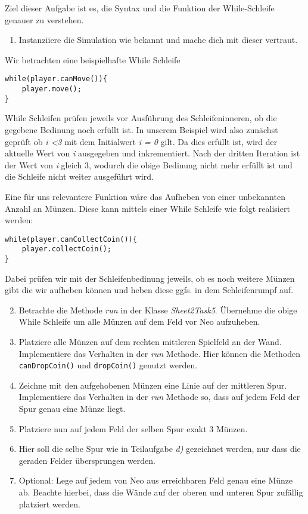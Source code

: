 
Ziel dieser Aufgabe ist es, die Syntax und die Funktion der While-Schleife genauer zu verstehen.
\begin{enumerate}[label=\alph*)]
    \item Instanziiere die Simulation wie bekannt und mache dich mit dieser vertraut.
\end{enumerate}

\begin{Infobox}
    Wir betrachten eine beispielhafte While Schleife
    \begin{lstlisting}[breaklines=true, numbers=none]
while(player.canMove()){
    player.move();
}
    \end{lstlisting}
    While Schleifen prüfen jeweils vor Ausführung des Schleifeninneren, ob die gegebene Bedinung noch erfüllt ist. In unserem Beispiel 
    wird also zunächst geprüft ob \textit{i \textless 3} mit dem Initialwert \textit{i = 0} gilt. Da dies erfüllt ist, wird der aktuelle Wert von \textit{i}
    ausgegeben und inkrementiert. Nach der dritten Iteration ist der Wert von \textit{i} gleich 3, wodurch die obige Bedinung nicht mehr erfüllt ist
    und die Schleife nicht weiter ausgeführt wird.\par 
    Eine für uns relevantere Funktion wäre das Aufheben von einer unbekannten Anzahl an Münzen. Diese kann mittels einer While Schleife wie folgt 
    realisiert werden:
    \begin{lstlisting}[breaklines=true, numbers=none]
while(player.canCollectCoin()){
    player.collectCoin();
}
    \end{lstlisting}
    Dabei prüfen wir mit der Schleifenbedinung
    jeweils, ob es noch weitere Münzen gibt die wir aufheben können und heben diese ggfs. in dem Schleifenrumpf auf.
\end{Infobox}

\begin{enumerate}[label=\alph*)] \setcounter{enumi}{1}
    \item Betrachte die Methode \textit{run} in der Klasse \textit{Sheet2Task5}. Übernehme die obige While Schleife um 
    alle Münzen auf dem Feld vor Neo aufzuheben.
    \item Platziere alle Münzen auf dem rechten mittleren Spielfeld an der Wand. Implementiere das Verhalten in der \textit{run} Methode.
    Hier können die Methoden \lstinline{canDropCoin()} und \lstinline{dropCoin()} genutzt werden.
    \item Zeichne mit den aufgehobenen Münzen eine Linie auf der mittleren Spur. Implementiere das Verhalten in der \textit{run} Methode so, dass 
    auf jedem Feld der Spur genau eine Münze liegt.
    \item Platziere nun auf jedem Feld der selben Spur exakt 3 Münzen.
    \item Hier soll die selbe Spur wie in Teilaufgabe \textit{d)} gezeichnet werden, nur dass die geraden Felder übersprungen werden.
    \item Optional: Lege auf jedem von Neo aus erreichbaren Feld genau eine Münze ab. Beachte hierbei, dass die Wände auf der oberen und unteren Spur zufällig platziert 
    werden.
\end{enumerate}